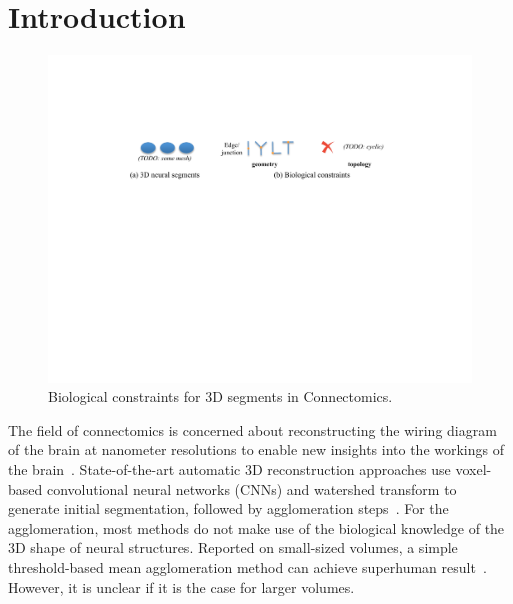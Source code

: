 \section{Introduction}

\begin{figure}[t]
	\centering
	\includegraphics[width=\linewidth]{./figures/bc/teaser_bc_v2.pdf}
	\caption{Biological constraints for 3D segments in Connectomics.}
	\label{fig:bc}
\end{figure}


The field of connectomics is concerned about reconstructing the wiring diagram of the brain at nanometer resolutions to enable new insights into the workings of the brain~\cite{haehn2017scalable,kasthuri2015saturated}. 
State-of-the-art automatic 3D reconstruction approaches use voxel-based convolutional neural networks (CNNs) and watershed transform to generate initial segmentation, followed by agglomeration steps~\cite{seymour2016rhoananet,lee2015recursive,nunez2014graph,parag2017anisotropic,ronneberger2015u,zlateski2015image}.
For the agglomeration, most methods do not make use of the biological knowledge of the 3D shape of neural structures.
Reported on small-sized volumes, a simple threshold-based mean agglomeration method can achieve superhuman result~\cite{lee2017superhuman}.
However, it is unclear if it is the case for larger volumes.



